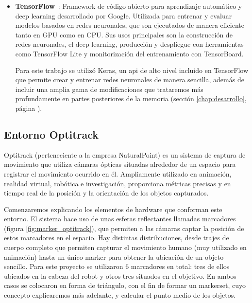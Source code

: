 \begin{itemize}
  \item \textbf{TensorFlow}~\cite{TensorflowWeb}: Framework de código abierto para aprendizaje automático y \Gls{deep learning} 
  desarrollado por Google\cite{GoogleWeb}. Utilizada para entrenar y evaluar modelos basados en redes neuronales, que son 
  ejecutados de manera eficiente tanto en GPU como en CPU. 
  Sus usos principales son la construcción de redes neuronales, el \Gls{deep learning}, producción y despliegue con herramientas como 
  TensorFlow Lite y monitorización del entrenamiento con TensorBoard.

  Para este trabajo se utilizó Keras\cite{KerasWeb}, un \Gls{api} de alto nivel incluido en TensorFlow que permite crear y entrenar 
  redes neuronales de manera sencilla, además de incluir una amplia gama de modificaciones que trataremos más profundamente en partes 
  posteriores de la memoria (sección \ref{chap:desarrollo}, página \pageref{chap:desarrollo}).
\end{itemize}


\subsection{Entorno Optitrack}
\label{sec:entorno_optitrack}

Optitrack (perteneciente a la empresa NaturalPoint\cite{NaturalPointWeb}) es un sistema de captura de movimiento 
que utiliza cámaras ópticas situadas alrededor de un espacio para registrar el movimiento ocurrido en él. Ampliamente utilizado en 
animación, realidad virtual, robótica e investigación, proporciona métricas precisas y en tiempo real de la posición y la orientación 
de los objetos capturados. 

Comenzaremos explicando los elementos de hardware que conforman este entorno. El sistema hace uso de unas esferas reflectantes llamadas 
marcadores (figura \ref{fig:marker_optitrack}), que permiten a las cámaras captar la posición de estos marcadores en el espacio. Hay distintas distribuciones, desde trajes de cuerpo completo que permiten 
capturar el movimiento humano (muy utilizado en animación) hasta un único marker para obtener la ubicación de un objeto sencillo. Para 
este proyecto se utilizaron 6 marcadores en total: tres de ellos ubicados en la cabeza del robot y otros tres situados en el objetivo. 
En ambos casos se colocaron en forma de triángulo, con el fin de formar un \gls{markerset}, cuyo concepto explicaremos más adelante, y calcular 
el punto medio de los objetos.



